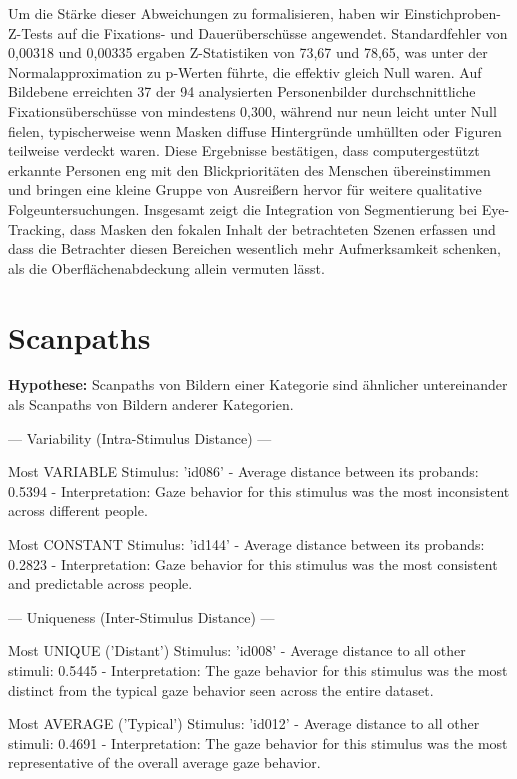 \documentclass[
    language=german, %
    thesis=seminar, %
    supervisor=postdoc, %
    multiauthor=true, %
    ]{settings/csssa-thesis}
\begin{document}
Um die Stärke dieser Abweichungen zu formalisieren, haben wir Einstichproben-Z-Tests auf die Fixations- 
und Dauerüberschüsse angewendet. Standardfehler von 0,00318 und 0,00335 ergaben Z-Statistiken von 
73,67 und 78,65, was unter der Normalapproximation zu p-Werten führte, die effektiv gleich Null waren. 
Auf Bildebene erreichten 37 der 94 analysierten Personenbilder durchschnittliche Fixationsüberschüsse von 
mindestens 0,300, während nur neun leicht unter Null fielen, typischerweise wenn Masken diffuse Hintergründe 
umhüllten oder Figuren teilweise verdeckt waren. Diese Ergebnisse bestätigen, dass computergestützt 
erkannte Personen eng mit den Blickprioritäten des Menschen übereinstimmen und bringen eine kleine 
Gruppe von Ausreißern hervor für weitere qualitative Folgeuntersuchungen. Insgesamt zeigt die 
Integration von Segmentierung bei Eye-Tracking, dass Masken den fokalen Inhalt der betrachteten 
Szenen erfassen und dass die Betrachter diesen Bereichen wesentlich mehr Aufmerksamkeit schenken, als die 
Oberflächenabdeckung allein vermuten lässt.

\section{Scanpaths}
 
\textbf{Hypothese:} Scanpaths von Bildern einer Kategorie sind ähnlicher untereinander als Scanpaths von Bildern anderer Kategorien.

--- Variability (Intra-Stimulus Distance) ---
 
Most VARIABLE Stimulus:      'id086'
  - Average distance between its probands: 0.5394
  - Interpretation: Gaze behavior for this stimulus was the most inconsistent across different people.
 
Most CONSTANT Stimulus:      'id144'
  - Average distance between its probands: 0.2823
  - Interpretation: Gaze behavior for this stimulus was the most consistent and predictable across people.
 
 
--- Uniqueness (Inter-Stimulus Distance) ---
 
Most UNIQUE ('Distant') Stimulus: 'id008'
  - Average distance to all other stimuli: 0.5445
  - Interpretation: The gaze behavior for this stimulus was the most distinct from the typical gaze behavior seen across the entire dataset.
 
Most AVERAGE ('Typical') Stimulus: 'id012'
  - Average distance to all other stimuli: 0.4691
  - Interpretation: The gaze behavior for this stimulus was the most representative of the overall average gaze behavior.
\end{document}
